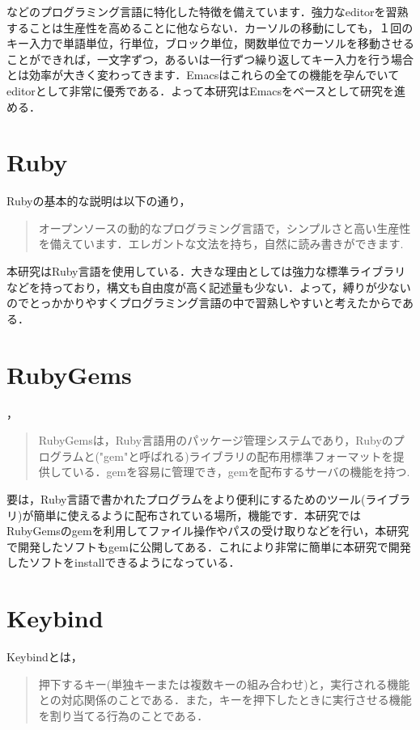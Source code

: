 などのプログラミング言語に特化した特徴を備えています．強力なeditorを習熟することは生産性を高めることに他ならない．カーソルの移動にしても，１回のキー入力で単語単位，行単位，ブロック単位，関数単位でカーソルを移動させることができれば，一文字ずつ，あるいは一行ずつ繰り返してキー入力を行う場合とは効率が大きく変わってきます．Emacsはこれらの全ての機能を孕んでいてeditorとして非常に優秀である．よって本研究はEmacsをベースとして研究を進める．

    \section{Ruby}\label{ruby}

Rubyの基本的な説明は以下の通り，
\begin{quotation}
オープンソースの動的なプログラミング言語で，シンプルさと高い生産性を備えています．エレガントな文法を持ち，自然に読み書きができます. \cite{ruby} 
\end{quotation}

本研究はRuby言語を使用している．大きな理由としては強力な標準ライブラリなどを持っており，構文も自由度が高く記述量も少ない．よって，縛りが少ないのでとっかかりやすくプログラミング言語の中で習熟しやすいと考えたからである．

    \section{RubyGems}\label{rubygems}
，
\begin{quotation}
RubyGemsは，Ruby言語用のパッケージ管理システムであり，Rubyのプログラムと("gem"と呼ばれる)ライブラリの配布用標準フォーマットを提供している．gemを容易に管理でき，gemを配布するサーバの機能を持つ.  \cite{gems} 
\end{quotation}


要は，Ruby言語で書かれたプログラムをより便利にするためのツール(ライブラリ)が簡単に使えるように配布されている場所，機能です．本研究ではRubyGemsのgemを利用してファイル操作やパスの受け取りなどを行い，本研究で開発したソフトもgemに公開してある．これにより非常に簡単に本研究で開発したソフトをinstallできるようになっている．

    \section{Keybind}\label{keybind}

Keybindとは，
\begin{quotation}
押下するキー(単独キーまたは複数キーの組み合わせ)と，実行される機能との対応関係のことである．また，キーを押下したときに実行させる機能を割り当てる行為のことである． \cite{keybind}
\end{quotation}

